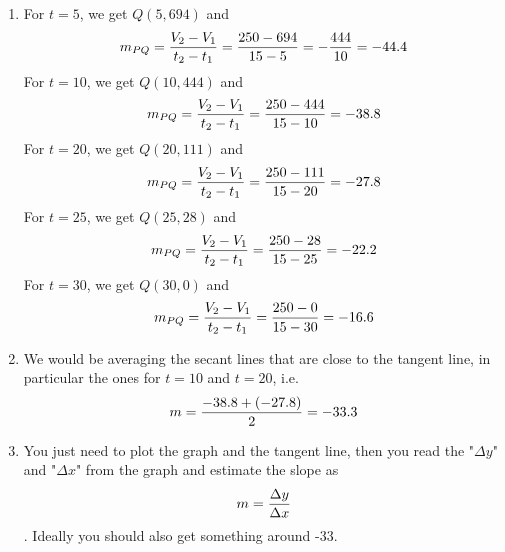 \documentclass[10pt]{article}
\begin{document}
\begin{enumerate}
\item
For $t=5$, we get $Q(5, 694)$ and
$$m_{PQ}={V_2-V_1\over t_2-t_1}={250-694\over 15-5}=-{444\over10}=-44.4$$
For $t=10$, we get $Q(10, 444)$ and
$$m_{PQ}={V_2-V_1\over t_2-t_1}={250-444\over 15-10}=-38.8$$
For $t=20$, we get $Q(20, 111)$ and
$$m_{PQ}={V_2-V_1\over t_2-t_1}={250-111\over 15-20}=-27.8$$
For $t=25$, we get $Q(25, 28)$ and
$$m_{PQ}={V_2-V_1\over t_2-t_1}={250-28\over 15-25}=-22.2$$
For $t=30$, we get $Q(30, 0)$ and
$$m_{PQ}={V_2-V_1\over t_2-t_1}={250-0\over 15-30}=-16.6$$
\item We would be averaging the secant lines that are close to the tangent
line, in particular the ones for $t=10$ and $t=20$, i.e.
$$m = {-38.8+(-27.8)\over 2} =-33.3$$ 
\item You just need to plot the graph and the tangent line, then you read the
"$\Delta y$" and "$\Delta x$" from the graph and estimate the slope as
$$m={\Delta y\over\Delta x}$$. Ideally you should also get something around
-33.
\end{enumerate}
\end{document}
